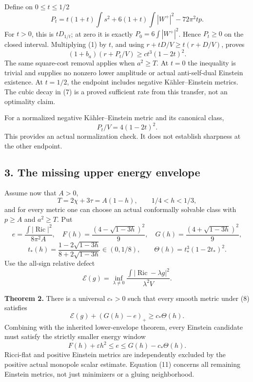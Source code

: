 \documentclass[
  11pt,
]{article}
\begin{document}
Define on \(0\le t\le1/2\) \[
 P_t=t(1+t)\int s^2+6(1+t)\int|W^+|^2-72\pi^2tp.
                                                               \tag{6}
\] For \(t>0\), this is \(tD_{1/t}\); at zero it is exactly
\(P_0=6\int|W^+|^2\). Hence \(P_t\ge0\) on the closed interval.
Multiplying (1) by \(t\), and using \(r+tD/V\ge t(r+D/V)\), proves \[
 \boxed{(1+b_a)(r+P_t/V)\ge c t^3(1-2t)^2.}             \tag{7}
\] The same square-cost removal applies when \(a^2\ge T\). At \(t=0\)
the inequality is trivial and supplies no nonzero lower amplitude or
actual anti-self-dual Einstein existence. At \(t=1/2\), the endpoint
includes negative Kähler--Einstein metrics. The cubic decay in (7) is a
proved sufficient rate from this transfer, not an optimality claim.

For a normalized negative Kähler--Einstein metric and its canonical
class, \[
 P_t/V=4(1-2t)^2.
\] This provides an actual normalization check. It does not establish
sharpness at the other endpoint.

\hypertarget{the-missing-upper-energy-envelope}{%
\subsection{3. The missing upper energy
envelope}\label{the-missing-upper-energy-envelope}}

Assume now that \(A>0\), \[
 T=2\chi+3\tau=A(1-h),\qquad 1/4<h<1/3,                 \tag{8}
\] and for every metric one can choose an actual conformally solvable
class with \(p\ge A\) and \(a^2\ge T\). Put \[
 e=\frac{\int|\operatorname{Ric}|^2}{8\pi^2A},\quad
 F(h)=\frac{(4-\sqrt{1-3h})^2}{9},\quad
 G(h)=\frac{(4+\sqrt{1-3h})^2}{9},
\] \[
 t_*(h)=\frac{1-2\sqrt{1-3h}}{8+2\sqrt{1-3h}}\in(0,1/8),
 \qquad \Theta(h)=t_*^3(1-2t_*)^2.                       \tag{9}
\] Use the all-sign relative defect \[
 \mathcal E(g)=\inf_{\lambda\ne0}
 \frac{\int|\operatorname{Ric}-\lambda g|^2}{\lambda^2V}.
\]

\textbf{Theorem 2.} There is a universal \(c_*>0\) such that every
smooth metric under (8) satisfies \[
 \boxed{\mathcal E(g)+(G(h)-e)_+\ge c_*\Theta(h).}        \tag{10}
\] Combining with the inherited lower-envelope theorem, every Einstein
candidate must satisfy the strictly smaller energy window \[
 \boxed{F(h)+\varepsilon h^2\le e
                       \le G(h)-c_*\Theta(h).}          \tag{11}
\] Ricci-flat and positive Einstein metrics are independently excluded
by the positive actual monopole scalar estimate. Equation (11) concerns
all remaining Einstein metrics, not just minimizers or a gluing
neighborhood.
\end{document}
